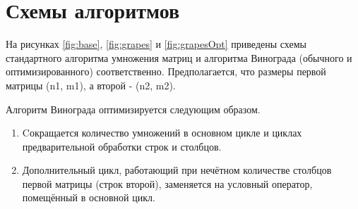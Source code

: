 \documentclass[12pt]{report}
\begin{document}
\section{Схемы алгоритмов}

На рисунках  \ref{fig:base}, \ref{fig:grapes} и \ref{fig:grapesOpt} приведены схемы стандартного алгоритма умножения матриц и алгоритма Винограда (обычного и оптимизированного) соответственно. Предполагается, что размеры первой матрицы (n1, m1), а второй - (n2, m2).

Алгоритм Винограда оптимизируется следующим образом.
\begin{enumerate}
\item Cокращается количество умножений в основном цикле и циклах предварительной обработки строк и столбцов.
\item Дополнительный цикл, работающий при нечётном количестве столбцов первой матрицы (строк второй), заменяется на условный оператор, помещённый в основной цикл.
\end{enumerate}
\end{document}
